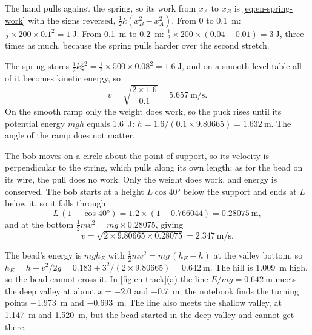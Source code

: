 The hand pulls against the spring, so its work
from $x_A$ to $x_B$ is \cref{eq:en-spring-work} with the signs reversed,
$\frac12 k(x_B^2 - x_A^2)$. From 0 to
\SI{0.1}{\metre}: $\frac12\times200\times0.1^2 = \SI{1}{\joule}$. From
\SI{0.1}{\metre} to \SI{0.2}{\metre}: $\frac12\times200\times(0.04 -
0.01) = \SI{3}{\joule}$, three times as much, because the spring pulls
harder over the second stretch.

The spring stores $\frac12 k\xi^2 = \frac12
\times500\times0.08^2 = \SI{1.6}{\joule}$, and on a smooth level table all
of it becomes kinetic energy, so
\begin{equation*}
   v = \sqrt{\frac{2\times1.6}{0.1}} = \SI{5.657}{\metre\per\second} .
\end{equation*}
On the smooth ramp only the weight does work, so the puck rises until its
potential energy $mgh$ equals \SI{1.6}{\joule}: $h = 1.6/(0.1\times
9.80665) = \SI{1.632}{\metre}$. The angle of the ramp does not matter.

The bob moves on a circle about the point of
support, so its velocity is perpendicular to the string, which pulls
along its own length; as for the bead on its wire, the pull does no work.
Only the weight does work, and energy is conserved. The bob starts at a
height $L\cos\ang{40}$ below the support and ends at $L$ below it, so it
falls through
\begin{equation*}
   L\,(1 - \cos\ang{40}) = 1.2\times(1 - 0.766044) = \SI{0.28075}{\metre} ,
\end{equation*}
and at the bottom $\frac12 mv^2 = mg\times0.28075$, giving
\begin{equation*}
   v = \sqrt{2\times9.80665\times0.28075} = \SI{2.347}{\metre\per\second} .
\end{equation*}

The bead's energy is $mgh_E$ with $\frac12 mv^2 =
mg\,(h_E - h)$ at the valley bottom, so $h_E = h + v^2/2g = 0.183 +
3^2/(2\times9.80665) = \SI{0.642}{\metre}$. The hill is
\SI{1.009}{\metre} high, so the bead cannot cross it. In
\cref{fig:en-track}(a) the line $E/mg = \SI{0.642}{\metre}$ meets the
deep valley at about $x = -2.0$ and \SI{-0.7}{\metre}; the notebook finds
the turning points \SI{-1.973}{\metre} and \SI{-0.693}{\metre}. The line
also meets the shallow valley, at \SI{1.147}{\metre} and
\SI{1.520}{\metre}, but the bead started in the deep valley and cannot get
there.

